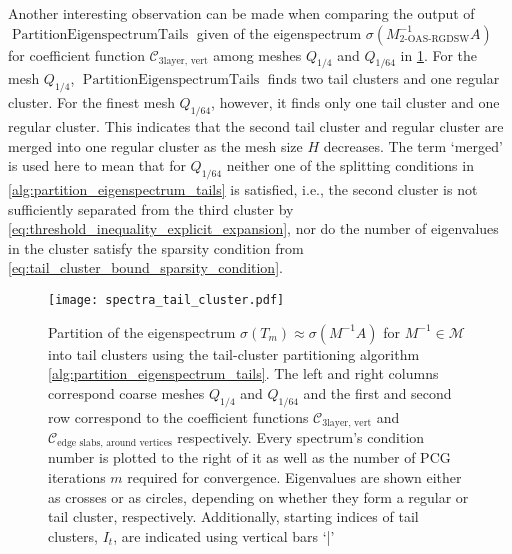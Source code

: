 Another interesting observation can be made when comparing the output of \newline$\operatorname{PartitionEigenspectrumTails}$ given of the eigenspectrum $\sigma(M_{\text{2-OAS-RGDSW}}^{-1}A)$ for coefficient function $\mathcal{C}_{\text{3layer, vert}}$ among meshes $Q_{1/4}$ and $Q_{1/64}$ in \cref{fig:partitioning_eigenspectrum_tails}. For the mesh $Q_{1/4}$, $\operatorname{PartitionEigenspectrumTails}$ finds two tail clusters and one regular cluster. For the finest mesh $Q_{1/64}$, however, it finds only one tail cluster and one regular cluster. This indicates that the second tail cluster and regular cluster are merged into one regular cluster as the mesh size $H$ decreases. The term `merged' is used here to mean that for $Q_{1/64}$ neither one of the splitting conditions in \cref{alg:partition_eigenspectrum_tails} is satisfied, i.e., the second cluster is not sufficiently separated from the third cluster by \cref{eq:threshold_inequality_explicit_expansion}, nor do the number of eigenvalues in the cluster satisfy the sparsity condition from \cref{eq:tail_cluster_bound_sparsity_condition}.
\begin{figure}[H]
    \centering
    \texttt{[image: spectra\_tail\_cluster.pdf]}
    \caption{Partition of the eigenspectrum $\sigma(T_m)\approx\sigma(M^{-1}A)$ for $M^{-1}\in\mathcal{M}$ into tail clusters using the tail-cluster partitioning algorithm \cref{alg:partition_eigenspectrum_tails}. The left and right columns correspond coarse meshes $Q_{1/4}$ and $Q_{1/64}$ and the first and second row correspond to the coefficient functions $\mathcal{C}_{\text{3layer, vert}}$ and $\mathcal{C}_{\text{edge slabs, around vertices}}$ respectively. Every spectrum's condition number is plotted to the right of it as well as the number of PCG iterations $m$ required for convergence. Eigenvalues are shown either as crosses or as circles, depending on whether they form a regular or tail cluster, respectively. Additionally, starting indices of tail clusters, $I_t$, are indicated using vertical bars `|'}
    \label{fig:partitioning_eigenspectrum_tails}
\end{figure}

